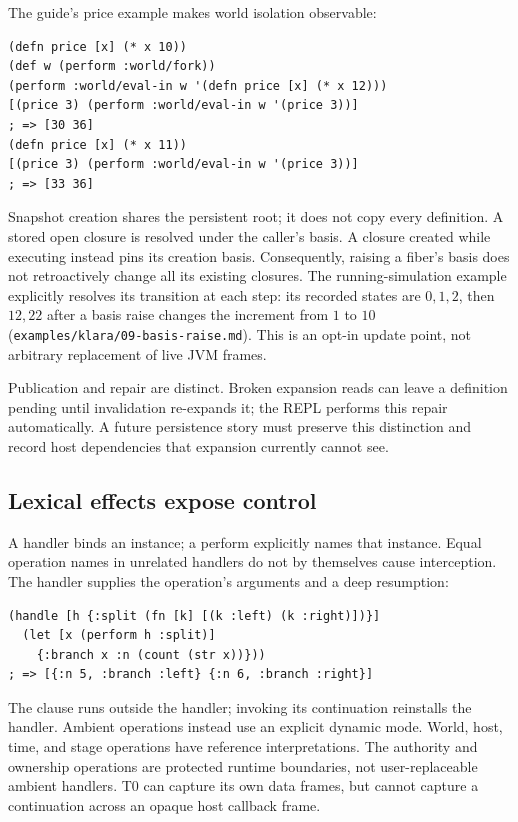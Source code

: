 \documentclass[acmsmall,screen,review,nonacm]{acmart}
\newcommand{\src}[1]{{\normalfont\nolinkurl{#1}}}
\begin{document}
The guide's price example makes world isolation observable:
\begin{lstlisting}
(defn price [x] (* x 10))
(def w (perform :world/fork))
(perform :world/eval-in w '(defn price [x] (* x 12)))
[(price 3) (perform :world/eval-in w '(price 3))]
; => [30 36]
(defn price [x] (* x 11))
[(price 3) (perform :world/eval-in w '(price 3))]
; => [33 36]
\end{lstlisting}
Snapshot creation shares the persistent root; it does not copy every definition.
A stored open closure is resolved under the caller's basis. A closure created
while executing instead pins its creation basis. Consequently, raising a
fiber's basis does not retroactively change all its existing closures. The
running-simulation example explicitly resolves its transition at each step:
its recorded states are $0,1,2$, then $12,22$ after a basis raise changes the
increment from $1$ to $10$ (\src{examples/klara/09-basis-raise.md}). This is an
opt-in update point, not arbitrary replacement of live JVM frames.

Publication and repair are distinct. Broken expansion reads can leave a
definition pending until invalidation re-expands it; the REPL performs this
repair automatically. A future persistence story must preserve this distinction
and record host dependencies that expansion currently cannot see.

\subsection{Lexical effects expose control}
A handler binds an instance; a perform explicitly names that instance. Equal
operation names in unrelated handlers do not by themselves cause interception.
The handler supplies the operation's arguments and a deep resumption:
\begin{lstlisting}
(handle [h {:split (fn [k] [(k :left) (k :right)])}]
  (let [x (perform h :split)]
    {:branch x :n (count (str x))}))
; => [{:n 5, :branch :left} {:n 6, :branch :right}]
\end{lstlisting}
The clause runs outside the handler; invoking its continuation reinstalls the
handler. Ambient operations instead use an explicit dynamic mode. World,
host, time, and stage operations have reference interpretations. The authority
and ownership operations are protected runtime boundaries, not user-replaceable
ambient handlers. T0 can capture its own data frames, but cannot capture a
continuation across an opaque host callback frame.
\end{document}
